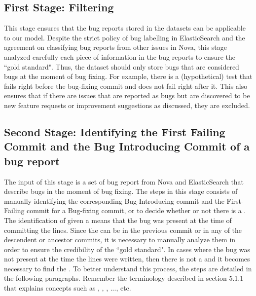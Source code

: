 \documentclass[a4paper, 12pt]{book}
\begin{document}
\subsection{First Stage: Filtering}
\label{sec:methodologyFS}

This stage ensures that the bug reports stored in the datasets can be applicable to our model. Despite the strict policy of bug labelling in ElasticSearch and the agreement on classifying bug reports from other issues in Nova, this stage analyzed carefully each piece of information in the bug reports to ensure the ``gold standard". Thus, the dataset should only store bugs that are considered bugs at the moment of bug fixing. For example, there is a (hypothetical) test that fails right before the bug-fixing commit and does not fail right after it.  This also ensures that if there are issues that are reported as bugs but are discovered to be new feature requests or improvement suggestions as discussed, they are excluded. 

\subsection{Second Stage: Identifying the First Failing Commit and the Bug Introducing Commit of a bug report}
\label{sec:methodologySS}

The input of this stage is a set of bug report from Nova and ElasticSearch that describe bugs in the moment of bug fixing. The steps in this stage consists of manually identifying the corresponding Bug-Introducing commit and the First-Failing commit for a Bug-fixing commit, or to decide whether or not there is a \BIC. The identification of \BIC given a \BFC means that the bug was present at the time of committing the lines. Since the \BIC can be in the previous commit or in any of the descendent or ancestor commits, it is necessary to manually analyze them in order to ensure the credibility of the ``gold standard". In cases where the bug was not present at the time the lines were written, then there is not a \BIC and it becomes necessary to find the \FFC. To better understand this process, the steps are detailed in the following paragraphs. Remember the terminology described in section 5.1.1 that explains concepts such as \BFC, , ,  ..., etc. 

\end{document}
